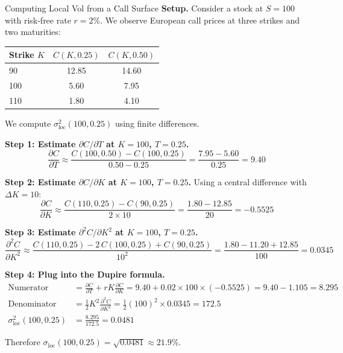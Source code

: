 \begin{workedexample}{Computing Local Vol from a Call Surface}
\label{ex:dupire-local-vol}
\textbf{Setup.} Consider a stock at $S = 100$ with risk-free rate $r = 2\%$.
We observe European call prices at three strikes and two maturities:

\begin{center}
\begin{tabular}{@{}lcc@{}}
\toprule
Strike $K$ & $C(K, 0.25)$ & $C(K, 0.50)$ \\
\midrule
90  & 12.85 & 14.60 \\
100 & 5.60  & 7.95  \\
110 & 1.80  & 4.10  \\
\bottomrule
\end{tabular}
\end{center}

We compute $\sigma_{\text{loc}}^2(100, 0.25)$ using finite differences.

\textbf{Step 1: Estimate $\partial C / \partial T$ at $K=100$, $T=0.25$.}
\[
  \frac{\partial C}{\partial T} \approx \frac{C(100, 0.50) - C(100, 0.25)}{0.50 - 0.25}
  = \frac{7.95 - 5.60}{0.25} = 9.40
\]

\textbf{Step 2: Estimate $\partial C / \partial K$ at $K=100$, $T=0.25$.}
Using a central difference with $\Delta K = 10$:
\[
  \frac{\partial C}{\partial K} \approx \frac{C(110, 0.25) - C(90, 0.25)}{2 \times 10}
  = \frac{1.80 - 12.85}{20} = -0.5525
\]

\textbf{Step 3: Estimate $\partial^2 C / \partial K^2$ at $K=100$, $T=0.25$.}
\[
  \frac{\partial^2 C}{\partial K^2} \approx \frac{C(110, 0.25) - 2\,C(100, 0.25) + C(90, 0.25)}{10^2}
  = \frac{1.80 - 11.20 + 12.85}{100} = 0.0345
\]

\textbf{Step 4: Plug into the Dupire formula.}
\begin{align*}
  \text{Numerator} &= \frac{\partial C}{\partial T} + rK\frac{\partial C}{\partial K}
    = 9.40 + 0.02 \times 100 \times (-0.5525)
    = 9.40 - 1.105 = 8.295 \\[6pt]
  \text{Denominator} &= \tfrac{1}{2}K^2 \frac{\partial^2 C}{\partial K^2}
    = \tfrac{1}{2}(100)^2 \times 0.0345
    = 172.5 \\[6pt]
  \sigma_{\text{loc}}^2(100, 0.25) &= \frac{8.295}{172.5} = 0.0481
\end{align*}

Therefore $\sigma_{\text{loc}}(100, 0.25) = \sqrt{0.0481} \approx 21.9\%$.
\end{workedexample}

